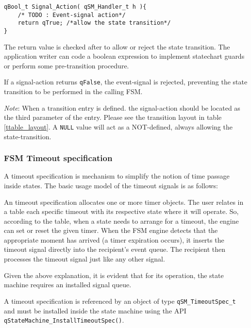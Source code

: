 \begin{lstlisting}[style=CStyle]
qBool_t Signal_Action( qSM_Handler_t h ){
    /* TODO : Event-signal action*/
    return qTrue; /*allow the state transition*/
}
\end{lstlisting}

The return value is checked after to allow or reject the state transition. The application writer can code a boolean expression to implement statechart guards or perform some pre-transition procedure.

\begin{tcolorbox}
\HandRight If a signal-action returns \lstinline{qFalse}, the event-signal is rejected, preventing the state transition to be performed in the calling FSM.
\end{tcolorbox}

\begin{tcolorbox}
\ArrowBoldDownRight \textit{Note}: When a transition entry is defined. the signal-action should be located as the third parameter of the entry. Please see the transition layout in table \ref{ttable_layout}.
A \lstinline{NULL} value will act as a NOT-defined, always allowing the state-transition. 
\end{tcolorbox}


\subsubsection{FSM Timeout specification}
A timeout specification is mechanism to simplify the notion of time passage inside states. The basic usage model of the timeout signals is as follows:

An timeout specification allocates one or more timer objects. The user relates in a table each specific timeout with its respective state where it will operate. So, according to the table, when a state needs to arrange for a timeout, the engine can set or reset the given timer.  When the FSM engine detects that the appropriate moment has arrived (a timer expiration occurs), it inserts the timeout signal directly into the recipient's event queue. The recipient then processes the timeout signal just like any other signal.

Given the above explanation, it is evident that for its operation, the state machine requires an installed signal queue.

A timeout specification is referenced by an object of type \lstinline{qSM_TimeoutSpec_t} and must be installed inside the state machine using the API \lstinline{qStateMachine_InstallTimeoutSpec()}.
\medskip

